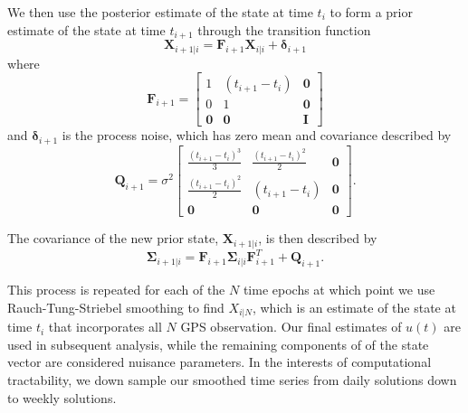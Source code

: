 \documentclass[12pt]{article}
\begin{document}
We then use the posterior estimate of the state at time $t_i$ to form a prior estimate of the state at time $t_{i+1}$ through the transition function
\begin{equation}\label{predict}
  \mathbf{X}_{i+1|i} = \mathbf{F}_{i+1}\mathbf{X}_{i|i} + \mathbf{\delta}_{i+1} 
\end{equation}
where 
\begin{equation}
  \mathbf{F}_{i+1} = 
  \left[
  \begin{array}{ccc}
    1           & (t_{i+1} - t_i) & \mathbf{0}\\
    0           & 1              & \mathbf{0}\\
    \mathbf{0}  & \mathbf{0}     & \mathbf{I}
  \end{array}
  \right]
\end{equation}
and $\mathbf{\delta}_{i+1}$ is the process noise, which has zero mean and covariance described by
\begin{equation}
  \mathbf{Q}_{i+1} = 
  \sigma^2 \left[
  \begin{array}{ccc}
  \frac{(t_{i+1} - t_i)^3}{3} & \frac{(t_{i+1} - t_{i})^2}{2} & \mathbf{0}\\
  \frac{(t_{i+1} - t_i)^2}{2} & (t_{i+1} - t_{i}) & \mathbf{0}\\ 
  \mathbf{0} & \mathbf{0} & \mathbf{0}
  \end{array}
  \right].
\end{equation}

The covariance of the new prior state, $\mathbf{X}_{i+1|i}$, is then described by
\begin{equation}
  \mathbf{\Sigma}_{i+1|i} = \mathbf{F}_{i+1}\mathbf{\Sigma}_{i|i}\mathbf{F}^T_{i+1} + \mathbf{Q}_{i+1}.
\end{equation}

This process is repeated for each of the $N$ time epochs at which point we use Rauch-Tung-Striebel smoothing to find $X_{i|N}$, which is an estimate of the state at time $t_i$ that incorporates all $N$ GPS observation.  Our final estimates of $u(t)$ are used in subsequent analysis, while the remaining components of of the state vector are considered nuisance parameters. In the interests of computational tractability, we down sample our smoothed time series from daily solutions down to weekly solutions.
\end{document}
